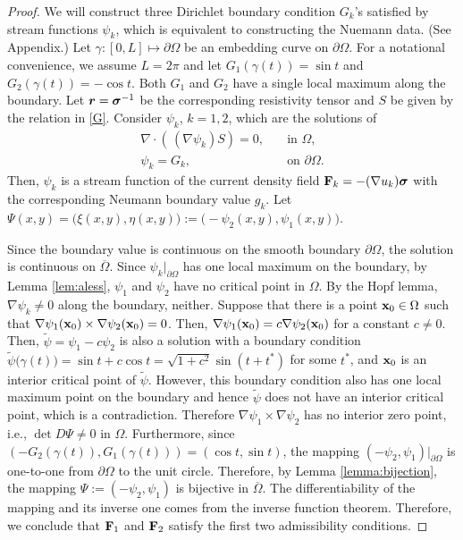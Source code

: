 \documentclass[11pt]{amsart}
\theoremstyle{plain}
\numberwithin{equation}{section}
\numberwithin{Thm}{section}
\def\F{{\bf F}}
\def\r{{\bf r}}
\def\x{{\bf x}}
\def\ds{\displaystyle}
\def\Sigma{\mbox{\boldmath$\sigma$}}
\def\r{\mbox{\boldmath$r$}}
\begin{document}
\begin{proof}  We will construct three Dirichlet boundary condition $G_k$'s satisfied by stream functions $\psi_k$, which is equivalent to constructing the Nuemann data. (See Appendix.) Let $\gamma:[0, L] \mapsto \partial\Omega$ be an embedding curve on $\partial\Omega$. For a notational convenience, we assume $L=2\pi$ and let $G_1(\gamma(t))=\sin t$ and $G_2(\gamma(t))=-\cos t$. Both $G_1$ and $G_2$ have a single local maximum along the boundary. Let $\r=\Sigma^{-1}$ be the corresponding resistivity tensor and $S$ be given by the relation in \eqref{G}. Consider $\psi_k$, $k=1,2$, which are the solutions of
\begin{equation}\label{Eqn3.3}
\begin{array}{cc}\ds
 \nabla\cdot(\,(\nabla \psi_k)S)  =0, &\quad \text{in $\Omega$},\\
 \psi_k=G_k, &\quad \text{on $\partial\Omega$}.
\end{array}
\end{equation}
Then, $\psi_k$ is a stream function of the current density field $\F_k = -(\nabla u_k)\Sigma$ with the corresponding Neumann boundary value $g_k$.  Let $\Psi(x,y) = \big(\xi(x,y),\eta(x,y)\big):=\big(-\psi_2(x,y), \psi_1(x,y)\big)$.

Since the boundary value is continuous on the smooth boundary $\partial\Omega$, the solution is continuous on $\overline\Omega$. Since $\psi_k|_{\partial\Omega}$ has one local maximum on the boundary, by Lemma \ref{lem:aless}, $\psi_1$ and $\psi_2$ have no critical point in $\Omega$. By the Hopf lemma, $\nabla\psi_k \ne 0$ along the boundary, neither. Suppose that there is a point $\x_0 \in \Omega$ such that $\nabla\psi_1(\x_0) \times \nabla\psi_2(\x_0) =0$. Then, $\nabla\psi_1(\x_0) = c \nabla\psi_2(\x_0)$ for a constant $c\ne0$. Then, $\tilde\psi = \psi_1 - c\psi_2$  is also a solution with a boundary condition $\tilde\psi\big(\gamma(t)\big) = \sin t + c\cos t =\sqrt{1+c^2} \sin(t+t^*)$ for some $t^*$, and $\x_0$ is an interior critical point of $\tilde\psi$. However, this boundary condition also has one local maximum point on the boundary and hence $\tilde\psi$ does not have an interior critical point, which is a contradiction. Therefore $\nabla\psi_1 \times \nabla\psi_2$  has no interior zero point, i.e., $\det D\Psi\ne0$ in $\Omega$. Furthermore, since $(-G_2(\gamma(t)),G_1(\gamma(t))) = (\cos t, \sin t)$, the mapping $(-\psi_2,\psi_1)|_{\partial \Omega}$ is one-to-one from $\partial\Omega$ to the unit circle. Therefore, by Lemma \ref{lemma:bijection}, the mapping $\Psi:=(-\psi_2,\psi_1)$ is bijective in $\overline\Omega$. The differentiability of the mapping and its inverse one comes from the inverse function theorem. Therefore, we conclude that $\F_1$ and $\F_2$ satisfy the first two admissibility conditions.


\end{proof}
\end{document}
